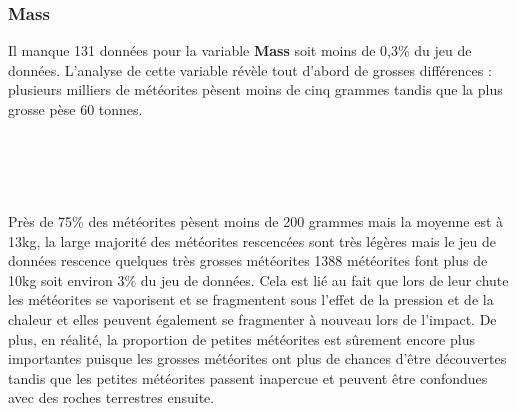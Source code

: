 \documentclass[12pt]{article}
\begin{document}
\subsubsection*{Mass}
Il manque 131 données pour la variable \textbf{Mass} soit moins de 0,3\% du jeu de données. L'analyse de cette variable révèle tout d'abord de grosses différences : plusieurs milliers de météorites pèsent moins de cinq grammes tandis que la plus grosse pèse 60 tonnes.\\
\\
\\
\\
\\
Près de 75\% des météorites pèsent moins de 200 grammes mais la moyenne est à 13kg, la large majorité des météorites rescencées sont très légères mais le jeu de données rescence quelques très grosses météorites 1388 météorites font plus de 10kg soit environ 3\% du jeu de données. Cela est lié au fait que lors de leur chute les météorites se vaporisent et se fragmentent sous l'effet de la pression et de la chaleur et elles peuvent également se fragmenter à nouveau lors de l'impact. De plus, en réalité, la proportion de petites météorites est sûrement encore plus importantes puisque les grosses météorites ont plus de chances d'être découvertes tandis que les petites météorites passent inapercue et peuvent être confondues avec des roches terrestres ensuite.
\end{document}
